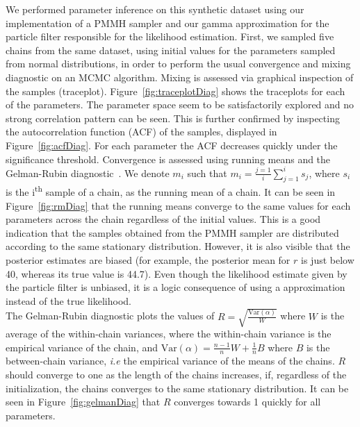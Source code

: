 \documentclass{article}
\begin{document}
	We performed parameter inference on this synthetic dataset using our implementation of a PMMH sampler and our gamma approximation for the particle filter responsible for the likelihood estimation. First, we sampled five chains from the same dataset, using initial values for the parameters sampled from normal distributions,  in order to perform the usual convergence and mixing diagnostic on an MCMC algorithm. Mixing is assessed via graphical inspection of the samples (traceplot). Figure~\ref{fig:traceplotDiag} shows the traceplots for each of the parameters. The parameter space seem to be satisfactorily explored and no strong correlation pattern can be seen. This is further confirmed by inspecting the autocorrelation function (ACF) of the samples, displayed in Figure~\ref{fig:acfDiag}. For each parameter the ACF decreases quickly under the significance threshold. Convergence is assessed using running means and the Gelman-Rubin diagnostic~\cite{gelman1992inference}. We denote $m_i$ such that $m_i=\frac{j=1}{i}\sum_{j=1}^{i}s_j$, where $s_i$ is the i\textsuperscript{th} sample of a chain, as the running mean of a chain. It can be seen in Figure~\ref{fig:rmDiag} that the running means converge to the same values for each parameters across the chain regardless of the initial values. This is a good indication that the samples obtained from the PMMH sampler are distributed according to the same stationary distribution. However, it is also visible that the posterior estimates are biased (for example, the posterior mean for $r$ is just below 40, whereas its true value is 44.7). Even though the likelihood estimate given by the particle filter is unbiased, it is a logic consequence of using a approximation instead of the true likelihood. \\
	The Gelman-Rubin diagnostic plots the values of $R = \sqrt{\frac{\mathrm{Var}(\alpha)}{W}}$ where $W$ is the average of the within-chain variances, where the within-chain variance is the empirical variance of the chain, and $ \mathrm{Var}(\alpha) = \frac{n-1}{n}W + \frac{1}{n}B$ where $B$ is the between-chain variance, \emph{i.e} the empirical variance of the means of the chains. $R$ should converge to one as the length of the chains increases, if, regardless of the initialization, the chains converges to the same stationary distribution. It can be seen in Figure~\ref{fig:gelmanDiag} that $R$ converges towards 1 quickly for all parameters. \\
	
\end{document}
